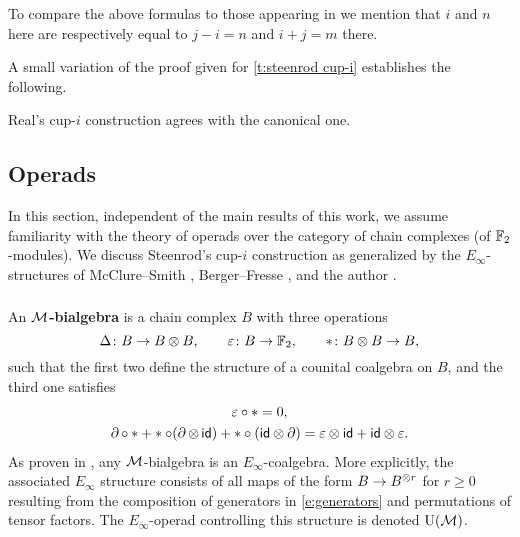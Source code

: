 \begin{remark}
	To compare the above formulas to those appearing in \cite[Corollary 3.2]{gonzalez-diaz1999steenrod} we mention that $i$ and $n$ here are respectively equal to $j-i=n$ and $i+j=m$ there.
\end{remark}

A small variation of the proof given for \cref{t:steenrod cup-i} establishes the following.

\begin{theorem}
	Real's \mbox{cup-$i$} construction agrees with the canonical one.
\end{theorem}

\subsection{Operads} \label{ss:operads}

In this section, independent of the main results of this work, we assume familiarity with the theory of operads over the category of chain complexes (of ${\mathbb{F}_2}$-modules).
We discuss Steenrod's cup-$i$ construction as generalized by the $E_\infty$-structures of McClure--Smith \cite{mcclure2003multivariable}, Berger--Fresse \cite{berger2004combinatorial}, and the author \cite{medina2020prop1}.

\subsubsection{}

An \textbf{$\operatorname{\mathcal{M}}$-bialgebra} is a chain complex $B$ with three operations
\begin{equation} \label{e:generators}
	\Delta \colon B \to B \otimes B, \qquad
	\varepsilon \colon B \to {\mathbb{F}_2}, \qquad
	\ast \colon B \otimes B \to B,
\end{equation}
such that the first two define the structure of a counital coalgebra on $B$, and the third one satisfies
\begin{gather*}
\varepsilon \circ \ast = 0, \\
\operatorname{\partial} \circ \ast + \ast \circ (\operatorname{\partial} \otimes \, \mathsf{id}) + \ast \circ (\mathsf{id} \otimes \operatorname{\partial}) =
\varepsilon \otimes \mathsf{id} + \mathsf{id} \otimes \varepsilon.
\end{gather*}
As proven in \cite{medina2020prop1}, any $\operatorname{\mathcal{M}}$-bialgebra is an $E_\infty$-coalgebra.
More explicitly, the associated $E_\infty$ structure consists of all maps of the form $B \to B^{\otimes r}$ for $r \geq 0$ resulting from the composition of generators in \cref{e:generators} and permutations of tensor factors.
The $E_\infty$-operad controlling this structure is denoted $\operatorname{U}(\operatorname{\mathcal{M}})$.

